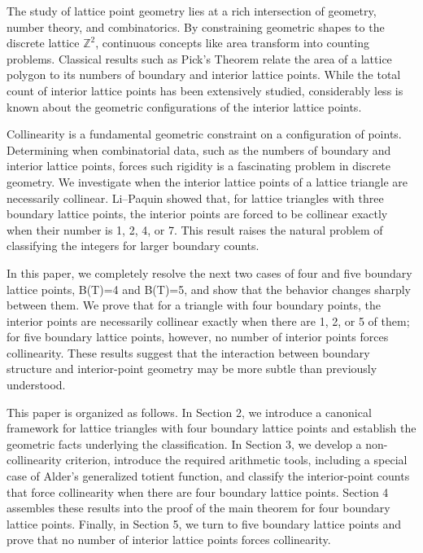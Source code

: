\documentclass{article}
\theoremstyle{mydefstyle}
\begin{document}
The study of lattice point geometry lies at a rich intersection of geometry, number theory, and combinatorics. By constraining geometric shapes to the discrete lattice $\mathbb{Z}^2$, continuous concepts like area transform into counting problems. Classical results such as Pick’s Theorem\cite{pick1899geometrisches} relate the area of a lattice polygon to its numbers of boundary and interior lattice points. While the total count of interior lattice points has been extensively studied, considerably less is known about the geometric configurations of the interior lattice points. 

Collinearity is a fundamental geometric constraint on a configuration of points. Determining when combinatorial data, such as the numbers of boundary and interior lattice points, forces such rigidity is a fascinating problem in discrete geometry. We investigate when the interior lattice points of a lattice triangle are necessarily collinear.
Li--Paquin\cite{li2025lattice} showed that, for lattice triangles with three boundary lattice points, the interior points are forced to be collinear exactly when their number is 1, 2, 4, or 7. This result raises the natural problem of classifying the integers for larger boundary counts. 

In this paper, we completely resolve the next two cases of four and five boundary lattice points, B(T)=4 and B(T)=5, and show that the behavior changes sharply between them. We prove that for a triangle with four boundary points, the interior points are necessarily collinear exactly when there are 1, 2, or 5 of them; for five boundary lattice points, however, no number of interior points forces collinearity. These results suggest that the interaction between boundary structure and interior-point geometry may be more subtle than previously understood.

This paper is organized as follows. In Section 2, we introduce a canonical framework for lattice triangles with four boundary lattice points and establish the geometric facts underlying the classification. In Section 3, we develop a non-collinearity criterion, introduce the required arithmetic tools, including a special case of Alder’s generalized totient function, and classify the interior-point counts that force collinearity when there are four boundary lattice points. Section 4 assembles these results into the proof of the main theorem for four boundary lattice points. Finally, in Section 5, we turn to five boundary lattice points and prove that no number of interior lattice points forces collinearity.
\end{document}
